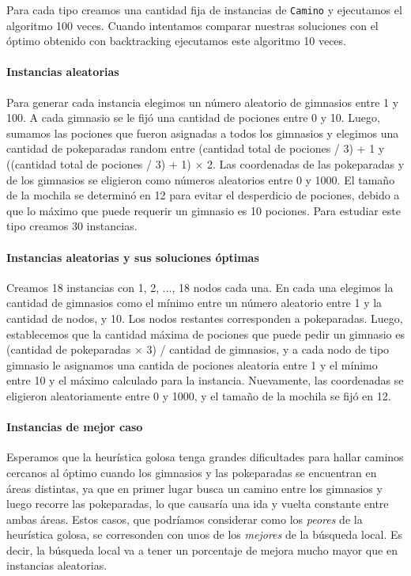 Para cada tipo creamos una cantidad fija de instancias de \texttt{Camino} y ejecutamos el algoritmo 100 veces. Cuando intentamos comparar nuestras soluciones con el \'optimo obtenido con backtracking ejecutamos este algoritmo 10 veces.

\paragraph{Instancias aleatorias}
Para generar cada instancia elegimos un n\'umero aleatorio de gimnasios entre 1 y 100. A cada gimnasio se le fij\'o una cantidad de pociones entre 0 y 10. Luego, sumamos las pociones que fueron asignadas a todos los gimnasios y elegimos una cantidad de pokeparadas random entre (cantidad total de pociones / 3) + 1 y ((cantidad total de pociones / 3) + 1) $\times$ 2. Las coordenadas de las pokeparadas y de los gimnasios se eligieron como n\'umeros aleatorios entre 0 y 1000. El tamaño de la mochila se determin\'o en 12 para evitar el desperdicio de pociones, debido a que lo m\'aximo que puede requerir un gimnasio es 10 pociones. Para estudiar este tipo creamos 30 instancias.

\paragraph{Instancias aleatorias y sus soluciones \'optimas}
Creamos 18 instancias con 1, 2, ..., 18 nodos cada una. En cada una elegimos la cantidad de gimnasios como el m\'inimo entre un n\'umero aleatorio entre 1 y la cantidad de nodos, y 10. Los nodos restantes corresponden a pokeparadas. Luego, establecemos que la cantidad m\'axima de pociones que puede pedir un gimnasio es (cantidad de pokeparadas $\times$ 3) / cantidad de gimnasios, y a cada nodo de tipo gimnasio le asignamos una cantida de pociones aleatoria entre 1 y el m\'inimo entre 10 y el m\'aximo calculado para la instancia. Nuevamente, las coordenadas se eligieron aleatoriamente entre 0 y 1000, y el tamaño de la mochila se fij\'o en 12.

\paragraph{Instancias de mejor caso}
Esperamos que la heur\'istica golosa tenga grandes dificultades para hallar caminos cercanos al \'optimo cuando los gimnasios y las pokeparadas se encuentran en \'areas distintas, ya que en primer lugar busca un camino entre los gimnasios y luego recorre las pokeparadas, lo que causar\'ia una ida y vuelta constante entre ambas \'areas. Estos casos, que podr\'iamos considerar como los \textit{peores} de la heur\'istica golosa, se corresonden con unos de los \textit{mejores} de la b\'usqueda local. Es decir, la b\'usqueda local va a tener un porcentaje de mejora mucho mayor que en instancias aleatorias.

